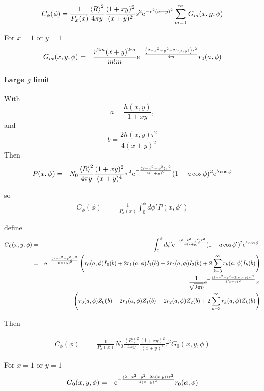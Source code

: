 \documentclass[11pt,openany]{report}
\newcommand{\e}{{\rm e}}
\begin{document}
{{$$C_{\phi}(\phi)=\frac{1}{P_x(x)}\frac{\left<R\right>^{2}}{4\pi y}\frac{(1+xy)^{2}}{(x+y)^{2}}s^{2}\e^{-r^{2}(x+y)^{2}}\sum_{m=1}^{\infty}G_{m}(x,y,\phi)$$


For $x=1$ or $y=1$
\begin{eqnarray}
G_{m}(x,y,\phi)&=&\frac{r^{2m}(x+y)^{2m}}{m!m}\e^{-\frac{\left(2-x^{2}-y^{2}-2h(x,y)\right)s^{2}}{4m}}r_{0}(a,\phi)\end{eqnarray}

\paragraph{Large $g$ limit}

With
$$a=\frac{h(x,y)}{1+xy},$$
and
$$b=\frac{2h(x,y)\tau^{2}}{4(x+y)^{2}}$$
Then
\begin{eqnarray} P(x,\phi)
&=&N_{0}\frac{\left<R\right>^{2}}{4\pi y}\frac{(1+xy)^{2}}{(x+y)^{4}}\tau^{2}\e^{-\frac{(2-x^{2}-y^{2})\tau^{2}}{4(x+y)^{2}}}(1-a\cos\phi)^{2}\e^{b\cos\phi}\end{eqnarray}

so
\begin{eqnarray}
C_{\phi}(\phi)&=&\frac{1}{P_x(x)}\int_{0}^{\phi}d\phi'P(x,\phi')
\end{eqnarray}

define
\begin{eqnarray}
G_{0}(x,y,\phi)&=&\int_{0}^{\phi}d\phi'\e^{-\frac{(2-x^{2}-y^{2})\tau^{2}}{4(x+y)^{2}}}(1-a\cos\phi')^{2}\e^{b\cos\phi'}\\&=&\e^{-\frac{(2-x^{2}-y^{2})\tau^{2}}{4(x+y)^{2}}}\left(r_{0}(a,\phi)I_{0}(b)+2r_{1}(a,\phi)I_{1}(b)+2r_{2}(a,\phi)I_{2}(b)+2\sum_{k=3}^{\infty}r_{k}(a,\phi)I_{k}(b)\right)\\
&=&\frac{1}{\sqrt{2\pi b}}\e^{-\frac{(2-x^{2}-y^{2}-2h(x,y))\tau^{2}}{4(x+y)^{2}}}\times\\&&\left(r_{0}(a,\phi)Z_{0}(b)+2r_{1}(a,\phi)Z_{1}(b)+2r_{2}(a,\phi)Z_{2}(b)+2\sum_{k=3}^{\infty}r_{k}(a,\phi)Z_{k}(b)\right)
\end{eqnarray}

Then

\begin{eqnarray}
C_{\phi}(\phi)&=&\frac{1}{P_x(x)}N_{0}\frac{\left<R\right>^{2}}{4\pi y}\frac{(1+xy)^{2}}{(x+y)^{4}}\tau^{2}G_{0}(x,y,\phi)
\end{eqnarray}

For $x=1$ or $y=1$
\begin{eqnarray}
G_{0}(x,y,\phi)&=&\e^{-\frac{(2-x^{2}-y^{2}-2h(x,y))\tau^{2}}{4(x+y)^{2}}}r_{0}(a,\phi)
\end{eqnarray}


}}
\end{document}
